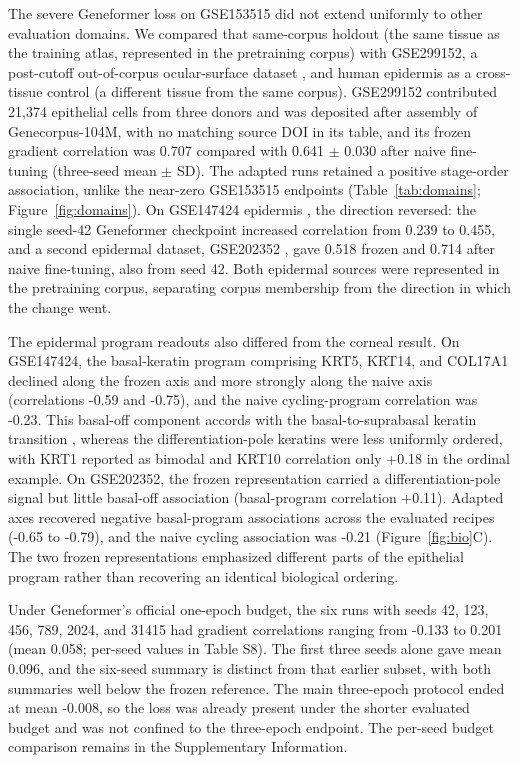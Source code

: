 \documentclass[12pt,letterpaper]{article}
\begin{document}
The severe Geneformer loss on GSE153515 did not extend uniformly to other evaluation domains. We compared that same-corpus holdout (the same tissue as the training atlas, represented in the pretraining corpus) with GSE299152, a post-cutoff out-of-corpus ocular-surface dataset \cite{gse299152}, and human epidermis as a cross-tissue control (a different tissue from the same corpus). GSE299152 contributed 21,374 epithelial cells from three donors and was deposited after assembly of Genecorpus-104M, with no matching source DOI in its table, and its frozen gradient correlation was 0.707 compared with 0.641 $\pm$ 0.030 after naive fine-tuning (three-seed mean $\pm$ SD). The adapted runs retained a positive stage-order association, unlike the near-zero GSE153515 endpoints (Table~\ref{tab:domains}; Figure~\ref{fig:domains}). On GSE147424 epidermis \cite{he2020epidermis}, the direction reversed: the single seed-42 Geneformer checkpoint increased correlation from 0.239 to 0.455, and a second epidermal dataset, GSE202352 \cite{wiedemann2023}, gave 0.518 frozen and 0.714 after naive fine-tuning, also from seed 42. Both epidermal sources were represented in the pretraining corpus, separating corpus membership from the direction in which the change went.

The epidermal program readouts also differed from the corneal result. On GSE147424, the basal-keratin program comprising KRT5, KRT14, and COL17A1 declined along the frozen axis and more strongly along the naive axis (correlations -0.59 and -0.75), and the naive cycling-program correlation was -0.23. This basal-off component accords with the basal-to-suprabasal keratin transition \cite{fuchs1980}, whereas the differentiation-pole keratins were less uniformly ordered, with KRT1 reported as bimodal and KRT10 correlation only +0.18 in the ordinal example. On GSE202352, the frozen representation carried a differentiation-pole signal but little basal-off association (basal-program correlation +0.11). Adapted axes recovered negative basal-program associations across the evaluated recipes (-0.65 to -0.79), and the naive cycling association was -0.21 (Figure~\ref{fig:bio}C). The two frozen representations emphasized different parts of the epithelial program rather than recovering an identical biological ordering.

Under Geneformer's official one-epoch budget, the six runs with seeds 42, 123, 456, 789, 2024, and 31415 had gradient correlations ranging from -0.133 to 0.201 (mean 0.058; per-seed values in Table S8). The first three seeds alone gave mean 0.096, and the six-seed summary is distinct from that earlier subset, with both summaries well below the frozen reference. The main three-epoch protocol ended at mean -0.008, so the loss was already present under the shorter evaluated budget and was not confined to the three-epoch endpoint. The per-seed budget comparison remains in the Supplementary Information.
\end{document}
